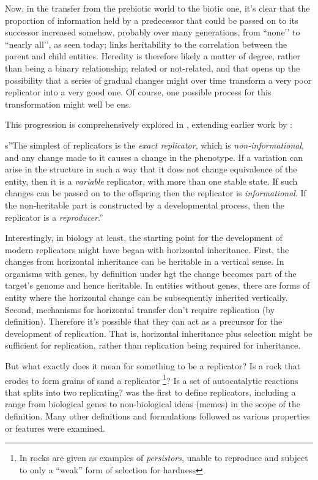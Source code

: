 Now, in the transfer from the prebiotic world to the biotic one, it’s clear that the proportion of information held by a predecessor that could be passed on to its successor increased somehow, probably over many generations, from ``none’’ to ``nearly all’’, as seen today; \textcite{Vasas2012a} links heritability to the correlation between the parent and child entities. Heredity is therefore likely a matter of degree, rather than being a binary relationship; related or not-related, and that opens up the possibility that a series of gradual changes might over time transform a very poor replicator into a very good one. Of course, one possible process for this transformation might well be \gls{ens}.

This progression is comprehensively explored in \textcite{Zachar2010}, extending earlier work by \textcite{Szathmary1999,Szathmary:2006ty}: 

s''The simplest of replicators is the \emph{exact replicator}, which is \emph{non-informational}, and any change made to it causes a change in the phenotype. If a variation can arise in the structure in such a way that it does not change equivalence of the entity, then it is a \emph{variable} replicator, with more than one stable state. If such changes can be passed on to the offspring then the replicator is \emph{informational}. If the non-heritable part is constructed by a developmental process, then the replicator is a \emph{reproducer}.'' \parencite[p.21]{Zachar2010}

Interestingly, in biology at least, the starting point for the development of modern replicators might have began with horizontal inheritance. First, the changes from horizontal inheritance can be heritable in a vertical sense. In organisms with genes, by definition under \gls{hgt} the change becomes part of the target’s genome and hence heritable. In entities without genes, there are forms of entity where the horizontal change can be subsequently inherited vertically. Second, mechanisms for horizontal transfer don’t require replication (by definition). Therefore it’s possible that they can act as a precursor for the development of replication. That is, horizontal inheritance plus selection might be sufficient for replication, rather than replication being required for inheritance.

But what exactly does it mean for something to be a replicator? Is a rock that erodes to form grains of sand a replicator \footnote{In \textcite{Bourrat2015} rocks are given as examples of \emph{persistors}, unable to reproduce and subject to only a ``weak'' form of selection for hardness}? Is a set of autocatalytic reactions that splits into two replicating? \Textcite{Dawkins1976} was the first to define replicators, including a range from biological genes to non-biological ideas (memes) in the scope of the definition. Many other definitions and formulations followed as various properties or features were examined. 

